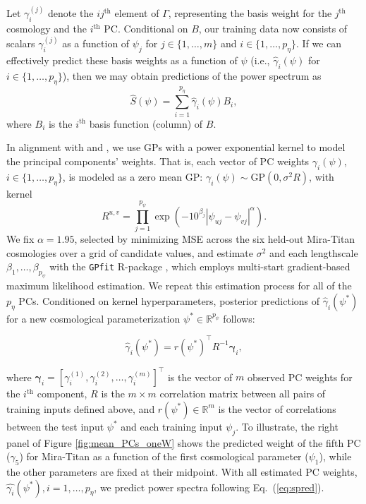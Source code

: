 \documentclass[11pt]{article}
\begin{document}
 
Let $\gamma_i^{(j)}$ denote the $ij^\textrm{th}$ element of $\Gamma$, representing the basis weight for the 
$j^\textrm{th}$ cosmology and the $i^\textrm{th}$ PC.
Conditional on $B$, our training data now consists of scalars $\gamma_i^{(j)}$ as a function of $\psi_j$
for $j \in \{1,\ldots,m\}$ and $i \in \{1,\ldots,p_\eta\}$.  If we can effectively predict these basis weights
as a function of $\psi$ (i.e., $\hat{\gamma}_i(\psi)$ for $i \in \{1,\ldots,p_\eta\}$), then we may obtain predictions 
of the power spectrum as
\begin{equation}\label{eq:spred}
\hat{S}(\psi) = \sum_{i=1}^{p_\eta} \hat{\gamma}_i(\psi) B_i,
\end{equation}
where $B_i$ is the $i^\textrm{th}$ basis function (column) of $B$.

In alignment with \cite{higdon2010estcosmo} and \cite{moran2023mira}, we use GPs with a power 
exponential kernel to model the principal components' weights. That is, each vector of PC 
weights $\gamma_i(\psi)$, $i \in \{1,\ldots,p_\eta\}$, is modeled as a zero mean 
GP: $\gamma_i(\psi) \sim \mathrm{GP}(0, \sigma^2R)$, with kernel
\begin{equation*}
    R^{u,v} = \prod_{j=1}^{p_\psi}\exp\left(-10^{\beta_j}|\psi_{uj}-\psi_{vj}|^\alpha\right).
\end{equation*}
We fix $\alpha=1.95$, selected by minimizing MSE across the 
six held-out Mira-Titan cosmologies over a grid of candidate values, and estimate $\sigma^2$ 
and each lengthscale $\beta_1,\ldots,\beta_{p_\psi}$ 
with the \texttt{GPfit} {\sf R}-package \citep{macdonald2015gpfit}, which employs multi-start 
gradient-based maximum likelihood estimation. We repeat this estimation
process for all of the $p_\eta$ PCs.  Conditioned on kernel hyperparameters,
posterior predictions of $\hat{\gamma}_i(\psi^*)$ for a new cosmological parameterization 
$\psi^* \in \mathbb{R}^{p_\psi}$ follows:

\begin{equation*}
\hat{\gamma}_i(\psi^*) = r(\psi^*)^\top R^{-1} \boldsymbol{\gamma}_i,
\end{equation*}

\noindent
where $\boldsymbol{\gamma}_i = [\gamma_i^{(1)}, \gamma_i^{(2)}, \ldots, \gamma_i^{(m)}]^\top$ 
is the vector of $m$ observed PC weights for the $i^\textrm{th}$ component, 
$R$ is the $m \times m$ correlation matrix between 
all pairs of training inputs defined above, and $r(\psi^*) \in \mathbb{R}^m$ is 
the vector of correlations between the test input $\psi^*$ and each training input 
$\psi_j$. To illustrate, the right panel of Figure \ref{fig:mean_PCs_oneW} shows
the predicted weight of the fifth PC ($\gamma_5$) for Mira-Titan as a function 
of the first cosmological parameter ($\psi_1$), while the other parameters are fixed 
at their midpoint.  With all estimated PC weights, $\hat{\gamma_i}(\psi^*), i=1,\ldots,p_\eta$, 
we predict power spectra following Eq.~(\ref{eq:spred}).  
\end{document}

